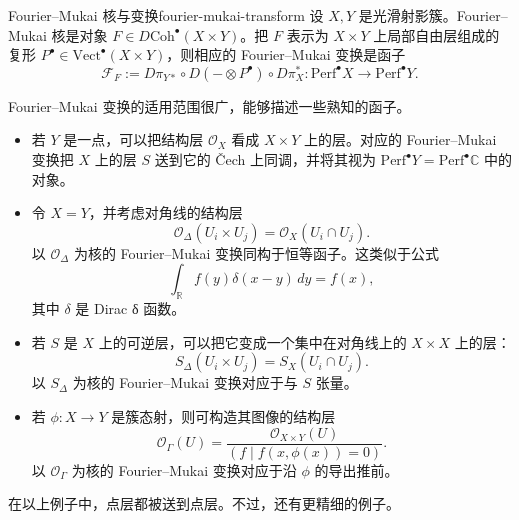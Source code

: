 \begin{definition}{Fourier--Mukai 核与变换}{fourier-mukai-transform}
设 $X,Y$ 是光滑射影簇。Fourier--Mukai 核是对象 $F\in D\mathrm{Coh}^{\bullet}(X\times Y)$。把 $F$ 表示为 $X\times Y$ 上局部自由层组成的复形 $P^{\bullet}\in\mathrm{Vect}^{\bullet}(X\times Y)$，则相应的 Fourier--Mukai 变换是函子
\[
  \mathcal F_F:=D\pi_{Y*}\circ D(-\otimes P^{\bullet})\circ D\pi_X^*
  \colon\mathrm{Perf}^{\bullet}X\longrightarrow\mathrm{Perf}^{\bullet}Y.
\]
\end{definition}

\begin{example}[几种熟悉的函子]
Fourier--Mukai 变换的适用范围很广，能够描述一些熟知的函子。
\begin{itemize}
  \item 若 $Y$ 是一点，可以把结构层 $\mathcal O_X$ 看成 $X\times Y$ 上的层。对应的 Fourier--Mukai 变换把 $X$ 上的层 $S$ 送到它的 Čech 上同调，并将其视为 $\mathrm{Perf}^{\bullet}Y=\mathrm{Perf}^{\bullet}\mathbb C$ 中的对象。
  \item 令 $X=Y$，并考虑对角线的结构层
  \[
    \mathcal O_{\Delta}(U_i\times U_j)=\mathcal O_X(U_i\cap U_j).
  \]
  以 $\mathcal O_\Delta$ 为核的 Fourier--Mukai 变换同构于恒等函子。这类似于公式
  \[
    \int_{\mathbb R}f(y)\delta(x-y)\,dy=f(x),
  \]
  其中 $\delta$ 是 Dirac δ 函数。
  \item 若 $S$ 是 $X$ 上的可逆层，可以把它变成一个集中在对角线上的 $X\times X$ 上的层：
  \[
    S_\Delta(U_i\times U_j)=S_X(U_i\cap U_j).
  \]
  以 $S_\Delta$ 为核的 Fourier--Mukai 变换对应于与 $S$ 张量。
  \item 若 $\phi\colon X\to Y$ 是簇态射，则可构造其图像的结构层
  \[
    \mathcal O_\Gamma(U)=\frac{\mathcal O_{X\times Y}(U)}{(f\mid f(x,\phi(x))=0)}.
  \]
   以 $\mathcal O_\Gamma$ 为核的 Fourier--Mukai 变换对应于沿 $\phi$ 的导出推前。
\end{itemize}
在以上例子中，点层都被送到点层。不过，还有更精细的例子。
\end{example}

